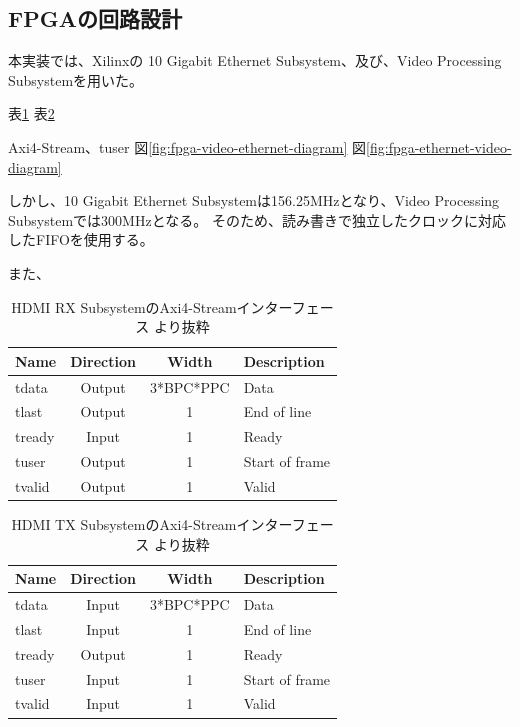 \subsection{FPGAの回路設計}

本実装では、Xilinxの 10 Gigabit Ethernet Subsystem、及び、Video Processing Subsystemを用いた。

表\ref{tb:pg236-vout-axi4-stream}
表\ref{tb:pg235-vin-axi4-stream}

Axi4-Stream、tuser
図\ref{fig:fpga-video-ethernet-diagram}
図\ref{fig:fpga-ethernet-video-diagram}


しかし、10 Gigabit Ethernet Subsystemは156.25MHzとなり、Video Processing Subsystemでは300MHzとなる。
そのため、読み書きで独立したクロックに対応したFIFOを使用する。

また、


\begin{table}[htbp]
  \caption{HDMI RX SubsystemのAxi4-Streamインターフェース \cite{xilinx-pg236}より抜粋}
  \label{tb:pg236-vout-axi4-stream}
  \begin{center}
  \begin{tabular}{l|c|c|l}
    \hline
    Name   & Direction & Width     & Description \\\hline\hline
    tdata  & Output    & 3*BPC*PPC & Data \\\hline
    tlast  & Output    & 1         & End of line \\\hline
    tready & Input     & 1         & Ready \\\hline
    tuser  & Output    & 1         & Start of frame \\\hline
    tvalid & Output    & 1         & Valid \\\hline
  \end{tabular}\end{center}
\end{table}

\begin{table}[htbp]
  \caption{HDMI TX SubsystemのAxi4-Streamインターフェース \cite{xilinx-pg235}より抜粋}
  \label{tb:pg235-vin-axi4-stream}
  \begin{center}
  \begin{tabular}{l|c|c|l}
    \hline
    Name   & Direction & Width     & Description \\\hline\hline
    tdata  & Input     & 3*BPC*PPC & Data \\\hline
    tlast  & Input     & 1         & End of line \\\hline
    tready & Output    & 1         & Ready \\\hline
    tuser  & Input     & 1         & Start of frame \\\hline
    tvalid & Input     & 1         & Valid \\\hline
  \end{tabular}\end{center}
\end{table}

